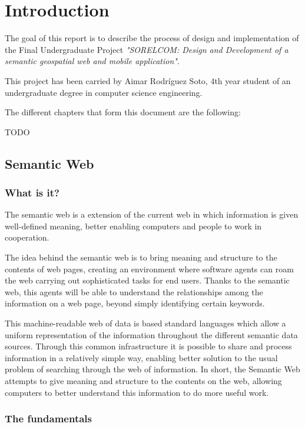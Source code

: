 \chapter{Introduction}\label{cha:intro}

The goal of this report is to describe the process of design and implementation of the Final Undergraduate Project \textit{"SORELCOM: Design and Development of a semantic geospatial web and mobile application"}.

This project has been carried by Aimar Rodr\'iguez Soto, 4th year student of an undergraduate degree in computer science engineering.

The different chapters that form this document are the following:

TODO

\section{Semantic Web}

\subsection{What is it?}

The semantic web is a extension of the current web in which information is given well-defined meaning, better enabling computers and people to work in cooperation. \cite{berners2001semantic}

The idea behind the semantic web is to bring meaning and structure to the contents of web pages, creating an environment where software agents can roam the web carrying out sophisticated tasks for end users. Thanks to the semantic web, this agents will be able to understand the relationships among the information on a web page, beyond simply identifying certain keywords. 

This machine-readable web of data is based standard languages which allow a uniform representation of the information throughout the different semantic data sources. Through this common infrastructure it is possible to share and process information in a relatively simple way, enabling better solution to the usual problem of searching through the web of information. In short, the Semantic Web attempts to give meaning and structure to the contents on the web, allowing computers to better understand this information to do more useful work.

\subsection{The fundamentals}

